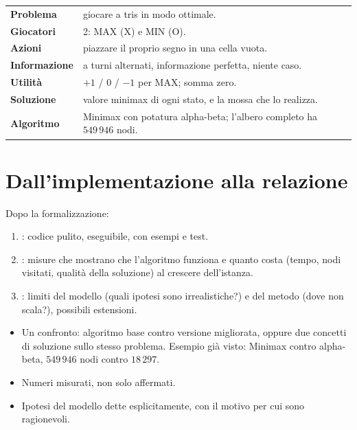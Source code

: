 \documentclass[11pt, a4paper, oneside, openany]{book}
\begin{document}
\begin{esempio}
\par\smallskip\noindent
\begin{tabularx}{\linewidth}{@{}>{\bfseries}l X@{}}
Problema      & giocare a tris in modo ottimale. \\
Giocatori     & 2: MAX (X) e MIN (O). \\
Azioni        & piazzare il proprio segno in una cella vuota. \\
Informazione  & a turni alternati, informazione perfetta, niente caso. \\
Utilità       & $+1$ / $0$ / $-1$ per MAX; somma zero. \\
Soluzione     & valore minimax di ogni stato, e la mossa che lo realizza. \\
Algoritmo     & Minimax con potatura alpha-beta; l'albero completo ha $549\,946$ nodi. \\
\end{tabularx}
\end{esempio}

\section{Dall'implementazione alla relazione}

Dopo la formalizzazione:
\begin{enumerate}[resume*]
  \item {}: codice pulito, eseguibile, con esempi e test.
  \item {}: misure che mostrano che l'algoritmo funziona e quanto costa
        (tempo, nodi visitati, qualità della soluzione) al crescere dell'istanza.
  \item {}: limiti del modello (quali ipotesi sono irrealistiche?) e del metodo
        (dove non scala?), possibili estensioni.
\end{enumerate}

\begin{osservazione}
\begin{itemize}
  \item Un confronto: algoritmo base contro versione migliorata, oppure due concetti di soluzione
        sullo stesso problema. Esempio già visto: Minimax contro alpha-beta, $549\,946$ nodi
        contro $18\,297$.
  \item Numeri misurati, non solo affermati.
  \item Ipotesi del modello dette esplicitamente, con il motivo per cui sono ragionevoli.
\end{itemize}
\end{osservazione}
\end{document}
